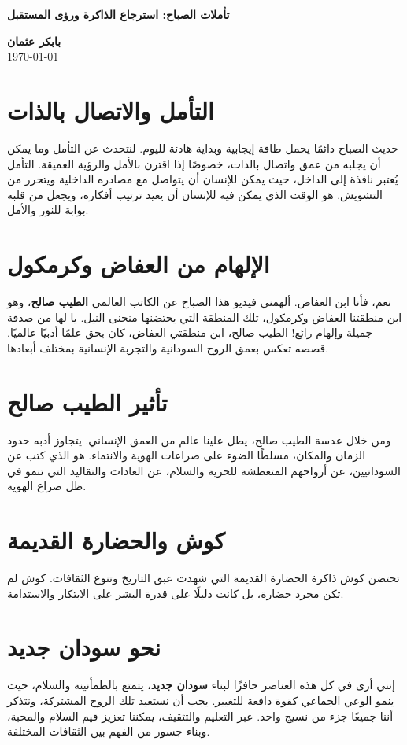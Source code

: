\documentclass[12pt]{article}
\begin{document}
\begin{center}
	{\Huge\textbf{\textcolor{titleColor}{ تأملات الصباح: استرجاع الذاكرة ورؤى المستقبل  }}}

    \vspace{0.5cm}
    
    \textbf{\textcolor{emphasisColor}{بابكر عثمان}} \\
    \vspace{0.2cm}
    \today
\end{center}

\section{التأمل والاتصال بالذات}
حديث الصباح دائمًا يحمل طاقة إيجابية وبداية هادئة لليوم. لنتحدث عن التأمل وما يمكن أن يجلبه من عمق واتصال بالذات، خصوصًا إذا اقترن بالأمل والرؤية العميقة.  
التأمل يُعتبر نافذة إلى الداخل، حيث يمكن للإنسان أن يتواصل مع مصادره الداخلية ويتحرر من التشويش. هو الوقت الذي يمكن فيه للإنسان أن يعيد ترتيب أفكاره، ويجعل من قلبه بوابة للنور والأمل.

\section{الإلهام من العفاض وكرمكول}
نعم، فأنا ابن العفاض. ألهمني فيديو هذا الصباح عن الكاتب العالمي \textbf{الطيب صالح}، وهو ابن منطقتنا العفاض وكرمكول، تلك المنطقة التي يحتضنها منحنى النيل.  
يا لها من صدفة جميلة وإلهام رائع! الطيب صالح، ابن منطقتي العفاض، كان بحق علمًا أدبيًا عالميًا. قصصه تعكس بعمق الروح السودانية والتجربة الإنسانية بمختلف أبعادها.  

\section{تأثير الطيب صالح}
ومن خلال عدسة الطيب صالح، يطل علينا عالم من العمق الإنساني. يتجاوز أدبه حدود الزمان والمكان، مسلطًا الضوء على صراعات الهوية والانتماء.  
هو الذي كتب عن السودانيين، عن أرواحهم المتعطشة للحرية والسلام، عن العادات والتقاليد التي تنمو في ظل صراع الهوية.

\section{كوش والحضارة القديمة}
تحتضن كوش ذاكرة الحضارة القديمة التي شهدت عبق التاريخ وتنوع الثقافات. كوش لم تكن مجرد حضارة، بل كانت دليلًا على قدرة البشر على الابتكار والاستدامة.  

\section{نحو سودان جديد}
إنني أرى في كل هذه العناصر حافزًا لبناء \textbf{سودان جديد}، يتمتع بالطمأنينة والسلام، حيث ينمو الوعي الجماعي كقوة دافعة للتغيير.  
يجب أن نستعيد تلك الروح المشتركة، ونتذكر أننا جميعًا جزء من نسيج واحد. عبر التعليم والتثقيف، يمكننا تعزيز قيم السلام والمحبة، وبناء جسور من الفهم بين الثقافات المختلفة.  
\end{document}
